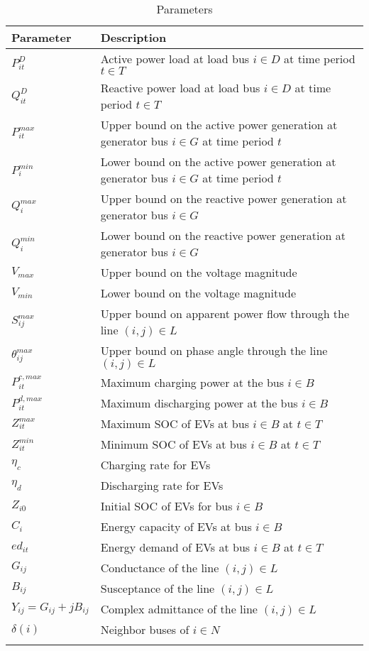 \begin{longtable}{lp{10cm}}
\toprule
Parameter & Description\\
\midrule
$P_{it}^{D}$ & Active power load at load bus $i \in D$ at time period $t \in T$\\[0.5em]
$Q_{it}^{D}$ & Reactive power load at load bus $i \in D$ at time period $t \in T$\\[0.5em]
$P_{it}^{max}$ & Upper bound on the active power generation at generator bus $i \in G$ at time period $t$\\[0.5em]
$P_{i}^{min}$ & Lower bound on the active power generation at generator bus $i \in G$ at time period $t$\\[0.5em]
$Q_{i}^{max}$ & Upper bound on the reactive power generation at generator bus $i \in G$\\[0.5em]
$Q_{i}^{min}$ & Lower bound on the reactive power generation at generator bus $i \in G$\\[0.5em]
$V_{max}$ & Upper bound on the voltage magnitude\\[0.5em]
$V_{min}$ & Lower bound on the voltage magnitude\\[0.5em]
$S_{ij}^{max}$ & Upper bound on apparent power flow through the line $(i,j) \in L$\\[0.5em]
$\theta_{ij}^{max}$ & Upper bound on phase angle through the line $(i,j) \in L$\\[0.5em]
$P_{it}^{c,max}$ & Maximum charging power at the bus $i \in B$\\[0.5em]
$P_{it}^{d,max}$ & Maximum discharging power at the bus $i \in B$\\[0.5em]
$Z_{it}^{max}$ & Maximum \gls{SOC} of \gls{EV}s at bus $i \in B$ at $t \in T$\\[0.5em]
$Z_{it}^{min}$ & Minimum \gls{SOC} of \gls{EV}s at bus $i \in B$ at $t \in T$\\[0.5em]
$\eta_{c}$ & Charging rate for \gls{EV}s\\[0.5em]
$\eta_{d}$ & Discharging rate for \gls{EV}s\\[0.5em]
$Z_{i0}$ & Initial \gls{SOC} of \gls{EV}s for bus $i \in B$\\[0.5em]
$C_{i}$ & Energy capacity of \gls{EV}s at bus $i \in B$\\[0.5em]
$ed_{it}$ & Energy demand of \gls{EV}s at bus $i \in B$ at $t \in T$ \\[0.5em]
$G_{ij}$ & Conductance of the line $(i,j) \in L$\\[0.5em]
$B_{ij}$ & Susceptance of the line $(i,j) \in L$\\[0.5em]
$Y_{ij} = G_{ij}+jB_{ij}$ & Complex admittance of the line $(i,j) \in L$\\[0.5em]
$\delta(i)$ & Neighbor buses of $i \in N$\\[0.5em]
\bottomrule
\caption{Parameters}\label{tab:parameters}
\end{longtable}

